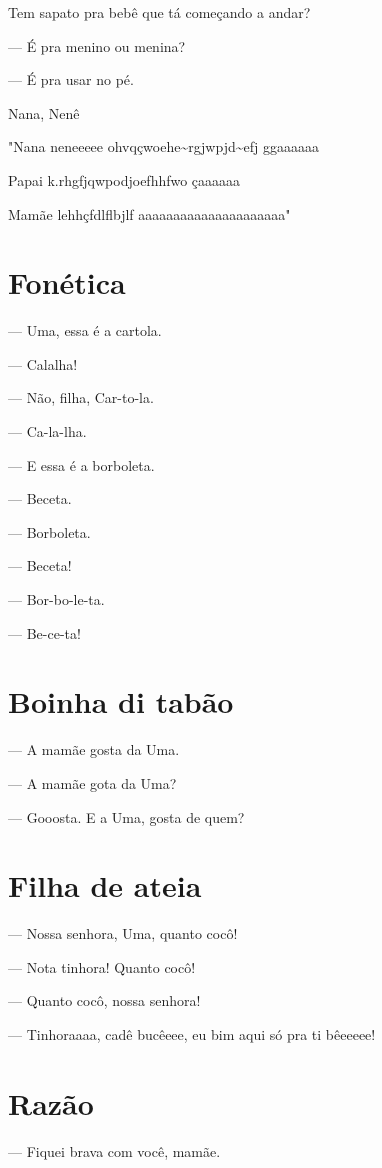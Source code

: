 Tem sapato pra bebê que tá começando a andar?

— É pra menino ou menina?

— É pra usar no pé.

Nana, Nenê

"Nana neneeeee ohvqçwoehe\textasciitilde{}rgjwpjd\textasciitilde{}efj
ggaaaaaa

Papai k.rhgfjqwpodjoefhhfwo çaaaaaa

Mamãe lehhçfdlflbjlf aaaaaaaaaaaaaaaaaaaaa"

\chapter{Fonética}

— Uma, essa é a cartola.

— Calalha!

— Não, filha, Car-to-la.

— Ca-la-lha.

— E essa é a borboleta.

— Beceta.

— Borboleta.

— Beceta!

— Bor-bo-le-ta.

— Be-ce-ta!

\chapter{Boinha di tabão}

— A mamãe gosta da Uma.

— A mamãe gota da Uma?

— Gooosta. E a Uma, gosta de quem?

\chapter{Filha de ateia}

— Nossa senhora, Uma, quanto cocô!

— Nota tinhora! Quanto cocô!

— Quanto cocô, nossa senhora!

— Tinhoraaaa, cadê bucêeee, eu bim aqui só pra ti bêeeeee!

\chapter{Razão}

— Fiquei brava com você, mamãe.

